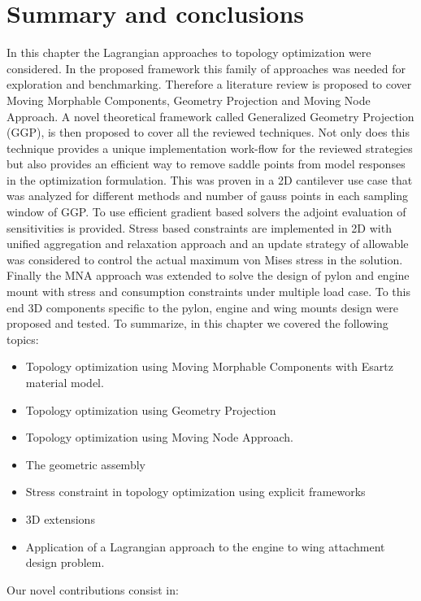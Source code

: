 \section{Summary and conclusions}
In this chapter the Lagrangian approaches to topology optimization were considered. In the proposed framework this family of approaches was needed for exploration and benchmarking. Therefore a literature review is proposed to cover Moving Morphable Components, Geometry Projection and Moving Node Approach. A novel theoretical framework called Generalized Geometry Projection (GGP), is then proposed to cover all the reviewed techniques. Not only does this technique provides a unique implementation work-flow for the reviewed strategies but also provides an efficient way to remove saddle points from model responses in the optimization formulation. This was proven in a 2D cantilever use case that was analyzed for different methods and number of gauss points in each sampling window of GGP. To use efficient gradient based solvers the adjoint evaluation of sensitivities is provided. Stress based constraints are implemented in 2D with unified aggregation and relaxation approach and an update strategy of allowable was considered to control the actual maximum von Mises stress in the solution. Finally the MNA approach was extended to solve the design of pylon and engine mount with stress and consumption constraints under multiple load case. To this end 3D components specific to the pylon, engine and wing mounts design were proposed and tested. To summarize, in this chapter we covered the following topics:
\begin{itemize}
\item Topology optimization using Moving Morphable Components with Esartz material model.
\item Topology optimization using Geometry Projection
\item Topology optimization using Moving Node Approach.
\item The geometric assembly
\item Stress constraint in topology optimization using explicit frameworks
\item 3D extensions
\item Application of a Lagrangian approach to the engine to wing attachment design problem.
\end{itemize}
Our novel contributions consist in:
